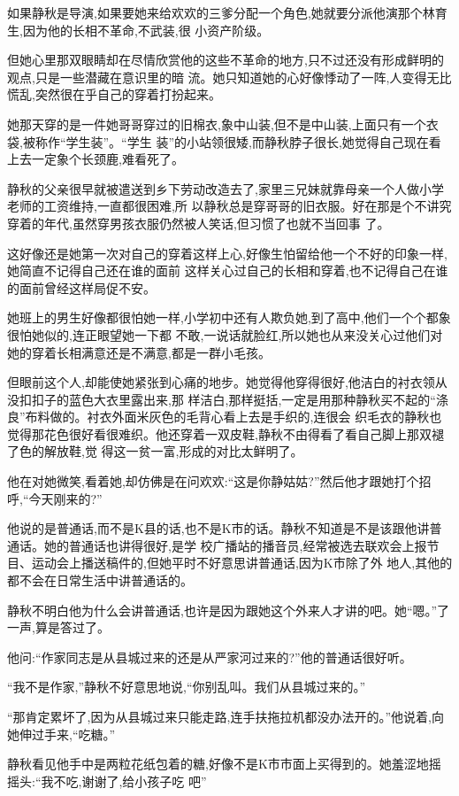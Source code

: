 ﻿\documentclass[12pt]{article}
\begin{document}
如果静秋是导演,如果要她来给欢欢的三爹分配一个角色,她就要分派他演那个林育生,因为他的长相不革命,不武装,很
小资产阶级。

但她心里那双眼睛却在尽情欣赏他的这些不革命的地方,只不过还没有形成鲜明的观点,只是一些潜藏在意识里的暗
流。她只知道她的心好像悸动了一阵,人变得无比慌乱,突然很在乎自己的穿着打扮起来。

她那天穿的是一件她哥哥穿过的旧棉衣,象中山装,但不是中山装,上面只有一个衣袋,被称作``学生装''。``学生
装''的小站领很矮,而静秋脖子很长,她觉得自己现在看上去一定象个长颈鹿,难看死了。

静秋的父亲很早就被遣送到乡下劳动改造去了,家里三兄妹就靠母亲一个人做小学老师的工资维持,一直都很困难,所
以静秋总是穿哥哥的旧衣服。好在那是个不讲究穿着的年代,虽然穿男孩衣服仍然被人笑话,但习惯了也就不当回事
了。

这好像还是她第一次对自己的穿着这样上心,好像生怕留给他一个不好的印象一样,她简直不记得自己还在谁的面前
这样关心过自己的长相和穿着,也不记得自己在谁的面前曾经这样局促不安。

她班上的男生好像都很怕她一样,小学初中还有人欺负她,到了高中,他们一个个都象很怕她似的,连正眼望她一下都
不敢,一说话就脸红,所以她也从来没关心过他们对她的穿着长相满意还是不满意,都是一群小毛孩。

但眼前这个人,却能使她紧张到心痛的地步。她觉得他穿得很好,他洁白的衬衣领从没扣扣子的蓝色大衣里露出来,那
样洁白,那样挺括,一定是用那种静秋买不起的``涤良''布料做的。衬衣外面米灰色的毛背心看上去是手织的,连很会
织毛衣的静秋也觉得那花色很好看很难织。他还穿着一双皮鞋,静秋不由得看了看自己脚上那双褪了色的解放鞋,觉
得这一贫一富,形成的对比太鲜明了。

他在对她微笑,看着她,却仿佛是在问欢欢:``这是你静姑姑?''然后他才跟她打个招呼,``今天刚来的?''

他说的是普通话,而不是K县的话,也不是K市的话。静秋不知道是不是该跟他讲普通话。她的普通话也讲得很好,是学
校广播站的播音员,经常被选去联欢会上报节目、运动会上播送稿件的,但她平时不好意思讲普通话,因为K市除了外
地人,其他的都不会在日常生活中讲普通话的。

静秋不明白他为什么会讲普通话,也许是因为跟她这个外来人才讲的吧。她``嗯。''了一声,算是答过了。

他问:``作家同志是从县城过来的还是从严家河过来的?''他的普通话很好听。

``我不是作家,''静秋不好意思地说,``你别乱叫。我们从县城过来的。''

``那肯定累坏了,因为从县城过来只能走路,连手扶拖拉机都没办法开的。''他说着,向她伸过手来,``吃糖。''

静秋看见他手中是两粒花纸包着的糖,好像不是K市市面上买得到的。她羞涩地摇摇头:``我不吃,谢谢了,给小孩子吃
吧\myrule ''
\end{document}
